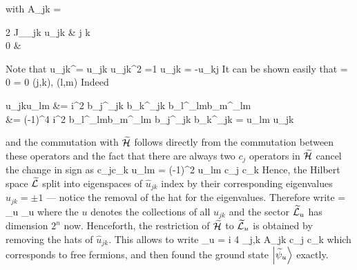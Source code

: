 		with
		\be \hat A_{jk} = \begin{cases} 2 J_{\alpha_{jk}} \hat u_{jk} &  j  k  \\ 0 &  \end{cases} \ee
		Note that
		\be \hat u_{jk}^\dagger = \hat u_{jk} \quad \hat u_{jk}^2 =1 \quad \hat u_{jk} = -\hat u_{kj} \ee
		It can be shown easily that
		 = 0  = 0 \quad \forall (j,k), (l,m) \ee
		Indeed
		\be \begin{split} \hat u_{jk}\hat u_{lm} &= i^2 b_j^{\alpha_{jk}} b_k^{\alpha_{jk}} b_l^{\alpha_{lm}}b_m^{\alpha_{lm}} \\ &= (-1)^4 i^2  b_l^{\alpha_{lm}}b_m^{\alpha_{lm}} b_j^{\alpha_{jk}} b_k^{\alpha_{jk}} = \hat u_{lm} \hat u_{jk} \end{split} \ee
		and the commutation with $\widetilde{\mathcal H}$ follows directly from the commutation between these operators and the fact that there are always two $c_j$ operators in $\widetilde{\mathcal H}$ cancel the change in sign as
		\be c_jc_k \hat u_{lm} = (-1)^2 \hat u_{lm} c_j c_k \ee
		Hence, the Hilbert space $\widetilde{\mathcal L}$ split into eigenspaces of $\hat u_{jk}$ index by their corresponding eigenvalues $u_{jk} = \pm 1$ --- notice the removal of the hat for the eigenvalues. Therefore write
		\be {} = \bigoplus_u _u \ee
		where the $u$ denotes the collections of all $u_{jk}$ and the sector $\widetilde{\mathcal L}_u$ has dimension $2^n$ now. Henceforth, the restriction of $\widetilde{\mathcal H}$ to $\widetilde{\mathcal L}_u$ is obtained by removing the hats of $\hat u_{jk}$. This allows to write
		\be {}_u = \frac i 4 \sum_{j,k} A_{jk} c_j c_k \label{eq:Hwidetildequad} \ee
		which corresponds to free fermions, and then found the ground state $\ket{\widetilde{\psi}_u}$ exactly.

